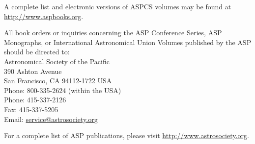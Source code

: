 \begin{center}
\hrulefill
\vspace{5pt}

A complete list and electronic versions of ASPCS volumes
may be found at \url{http://www.aspbooks.org}.
\vspace{5pt}

All book orders or inquiries concerning the ASP Conference Series, 
ASP Monographs, or International Astronomical Union Volumes published 
by the ASP should be directed to:\\
\vspace{5pt}
Astronomical Society of the Pacific\\
390 Ashton Avenue\\
San Francisco, CA  94112-1722  USA\\
Phone: 800-335-2624 (within the USA)\\
Phone: 415-337-2126\\
Fax: 415-337-5205\\
Email: \url{service@astrosociety.org}
\vspace{10pt}

For a complete list of ASP publications, please visit
\url{http://www.astrosociety.org}.

\end{center}

%
